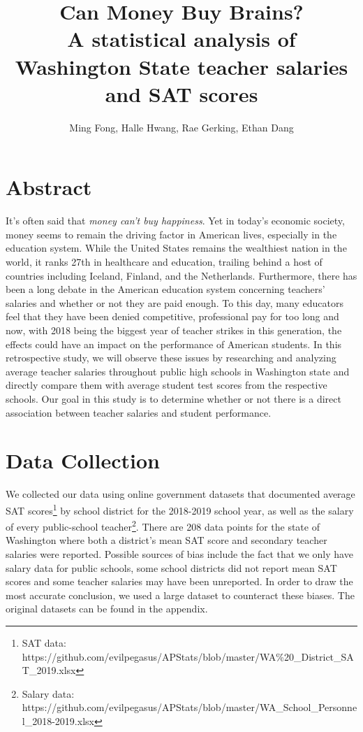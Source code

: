 \documentclass[11pt]{article} %
\title{Can Money Buy Brains? \\
	\large A statistical analysis of Washington State teacher salaries and SAT scores}
\author{Ming Fong, Halle Hwang, Rae Gerking, Ethan Dang}
\begin{document}
\maketitle

\section{Abstract}

It’s often said that \textit{money can't buy happiness}. Yet in today’s economic society, money seems to remain the driving factor in American lives, especially in the education system. While the United States remains the wealthiest nation in the world, it ranks 27th in healthcare and education, trailing behind a host of countries including Iceland, Finland, and the Netherlands. Furthermore, there has been a long debate in the American education system concerning teachers’ salaries and whether or not they are paid enough. To this day, many educators feel that they have been denied competitive, professional pay for too long and now, with 2018 being the biggest year of teacher strikes in this generation, the effects could have an impact on the performance of American students. In this retrospective study, we will observe these issues by researching and analyzing average teacher salaries throughout public high schools in Washington state and directly compare them with average student test scores from the respective schools. Our goal in this study is to determine whether or not there is a direct association between teacher salaries and student performance.

\section{Data Collection}

We collected our data using online government datasets that documented average SAT scores\footnote{SAT data: https://github.com/evilpegasus/APStats/blob/master/WA\%20\_District\_SAT\_2019.xlsx} by school district for the 2018-2019 school year, as well as the salary of every public-school teacher\footnote{ Salary data: https://github.com/evilpegasus/APStats/blob/master/WA\_School\_Personnel\_2018-2019.xlsx}. There are 208 data points for the state of Washington where both a district's mean SAT score and secondary teacher salaries were reported. Possible sources of bias include the fact that we only have salary data for public schools, some school districts did not report mean SAT scores and some teacher salaries may have been unreported. In order to draw the most accurate conclusion, we used a large dataset to counteract these biases. The original datasets can be found in the appendix.
\end{document}
